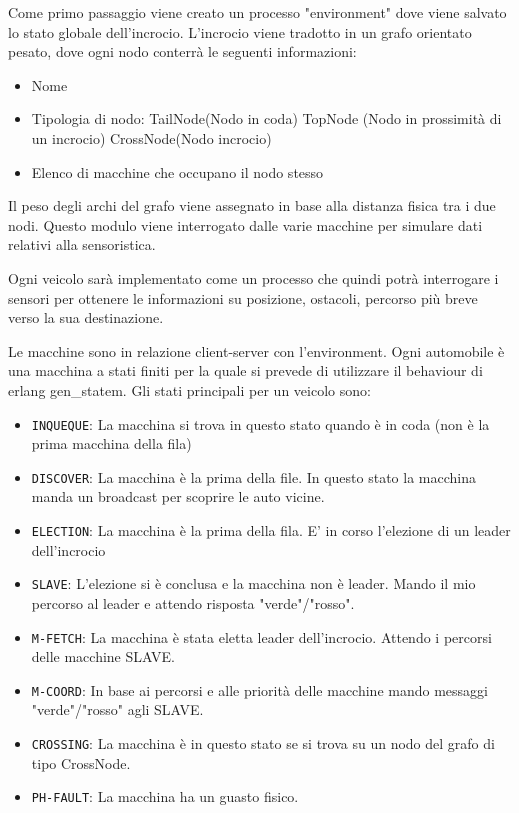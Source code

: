 \documentclass{memoir}
\begin{document}
Come primo passaggio viene creato un processo "environment" dove viene salvato
lo stato globale dell'incrocio. L'incrocio viene tradotto in un grafo orientato
pesato, dove ogni nodo conterrà le seguenti informazioni:
\begin{itemize}
\item Nome
\item Tipologia di nodo: TailNode(Nodo in coda) TopNode (Nodo in prossimità di
  un incrocio) CrossNode(Nodo incrocio)
\item Elenco di macchine che occupano il nodo stesso
\end{itemize}
Il peso degli archi del grafo viene assegnato in base alla distanza fisica tra i
due nodi.
Questo modulo viene interrogato dalle varie macchine per simulare dati relativi
alla sensoristica.

Ogni veicolo sarà implementato come un processo che quindi potrà interrogare i
sensori per ottenere le informazioni su posizione, ostacoli, percorso più breve
verso la sua destinazione.

Le macchine sono in relazione client-server con l'environment. Ogni automobile è
una macchina a stati finiti per la quale si prevede di utilizzare il behaviour
di erlang gen\_statem. Gli stati principali per un veicolo sono:
\begin{itemize}
\item \texttt{INQUEQUE}: La macchina si trova in questo stato quando è in coda
  (non è la prima macchina della fila)
\item \texttt{DISCOVER}: La macchina è la prima della file. In questo stato la
  macchina manda un broadcast per scoprire le auto vicine.
\item \texttt{ELECTION}: La macchina è la prima della fila. E' in corso
  l'elezione di un leader dell'incrocio
\item \texttt{SLAVE}: L'elezione si è conclusa e la macchina non è leader. Mando
  il mio percorso al leader e attendo risposta "verde"/"rosso".
\item \texttt{M-FETCH}: La macchina è stata eletta leader dell'incrocio. Attendo
  i percorsi delle macchine SLAVE.
\item \texttt{M-COORD}: In base ai percorsi e alle priorità delle macchine mando
  messaggi "verde"/"rosso" agli SLAVE.
\item \texttt{CROSSING}: La macchina è in questo stato se si trova su un nodo
  del grafo di tipo CrossNode.
\item \texttt{PH-FAULT}: La macchina ha un guasto fisico.
\end{itemize}
\end{document}

